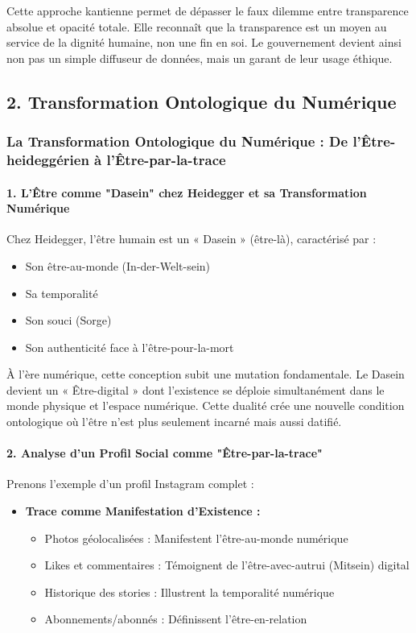 \documentclass[12pt]{article}
\begin{document}
Cette approche kantienne permet de dépasser le faux dilemme entre transparence absolue et opacité totale. Elle reconnaît que la transparence est un moyen au service de la dignité humaine, non une fin en soi. Le gouvernement devient ainsi non pas un simple diffuseur de données, mais un garant de leur usage éthique.

\subsection*{2. Transformation Ontologique du Numérique}

\subsubsection*{La Transformation Ontologique du Numérique : De l'Être-heideggérien à l'Être-par-la-trace}

\paragraph{1. L'Être comme "Dasein" chez Heidegger et sa Transformation Numérique}

Chez Heidegger, l'être humain est un « Dasein » (être-là), caractérisé par :
\begin{itemize}
\item Son être-au-monde (In-der-Welt-sein)
\item Sa temporalité
\item Son souci (Sorge)
\item Son authenticité face à l'être-pour-la-mort
\end{itemize}

À l'ère numérique, cette conception subit une mutation fondamentale. Le Dasein devient un « Être-digital » dont l'existence se déploie simultanément dans le monde physique et l'espace numérique. Cette dualité crée une nouvelle condition ontologique où l'être n'est plus seulement incarné mais aussi datifié.

\paragraph{2. Analyse d'un Profil Social comme "Être-par-la-trace"}

Prenons l'exemple d'un profil Instagram complet :

\begin{itemize}
\item \textbf{Trace comme Manifestation d'Existence :}
  \begin{itemize}
  \item Photos géolocalisées : Manifestent l'être-au-monde numérique
  \item Likes et commentaires : Témoignent de l'être-avec-autrui (Mitsein) digital
  \item Historique des stories : Illustrent la temporalité numérique
  \item Abonnements/abonnés : Définissent l'être-en-relation
  \end{itemize}
\end{itemize}
\end{document}
